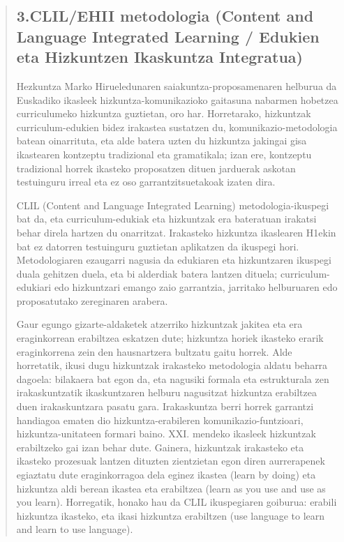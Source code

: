 \documentclass[
]{book}
\begin{document}
\begin{quote}
\hypertarget{clilehii-metodologia-content-and-language-integrated-learning-edukien-eta-hizkuntzen-ikaskuntza-integratua}{%
\subsection{3.CLIL/EHII metodologia (Content and Language Integrated Learning / Edukien eta Hizkuntzen Ikaskuntza Integratua)}\label{clilehii-metodologia-content-and-language-integrated-learning-edukien-eta-hizkuntzen-ikaskuntza-integratua}}

Hezkuntza Marko Hirueledunaren saiakuntza-proposamenaren helburua da Euskadiko ikasleek hizkuntza-komunikazioko gaitasuna nabarmen hobetzea curriculumeko hizkuntza guztietan, oro har. Horretarako, hizkuntzak curriculum-edukien bidez irakastea sustatzen du, komunikazio-metodologia batean oinarrituta, eta alde batera uzten du hizkuntza jakingai gisa ikastearen kontzeptu tradizional eta gramatikala; izan ere, kontzeptu tradizional horrek ikasteko proposatzen dituen jarduerak askotan testuinguru irreal eta ez oso garrantzitsuetakoak izaten dira.

CLIL (Content and Language Integrated Learning) metodologia-ikuspegi bat da, eta curriculum-edukiak eta hizkuntzak era bateratuan irakatsi behar direla hartzen du onarritzat. Irakasteko hizkuntza ikaslearen H1ekin bat ez datorren testuinguru guztietan aplikatzen da ikuspegi hori. Metodologiaren ezaugarri nagusia da edukiaren eta hizkuntzaren ikuspegi duala gehitzen duela, eta bi alderdiak batera lantzen dituela; curriculum-edukiari edo hizkuntzari emango zaio garrantzia, jarritako helburuaren edo proposatutako zereginaren arabera.

Gaur egungo gizarte-aldaketek atzerriko hizkuntzak jakitea eta era eraginkorrean erabiltzea eskatzen dute; hizkuntza horiek ikasteko erarik eraginkorrena zein den hausnartzera bultzatu gaitu horrek. Alde horretatik, ikusi dugu hizkuntzak irakasteko metodologia aldatu beharra dagoela: bilakaera bat egon da, eta nagusiki formala eta estrukturala zen irakaskuntzatik ikaskuntzaren helburu nagusitzat hizkuntza erabiltzea duen irakaskuntzara pasatu gara. Irakaskuntza berri horrek garrantzi handiagoa ematen dio hizkuntza-erabileren komunikazio-funtzioari, hizkuntza-unitateen formari baino. XXI. mendeko ikasleek hizkuntzak erabiltzeko gai izan behar dute. Gainera, hizkuntzak irakasteko eta ikasteko prozesuak lantzen dituzten zientzietan egon diren aurrerapenek egiaztatu dute eraginkorragoa dela eginez ikastea (learn by doing) eta hizkuntza aldi berean ikastea eta erabiltzea (learn as you use and use as you learn). Horregatik, honako hau da CLIL ikuspegiaren goiburua: erabili hizkuntza ikasteko, eta ikasi hizkuntza erabiltzen (use language to learn and learn to use language).


\end{quote}
\end{document}
